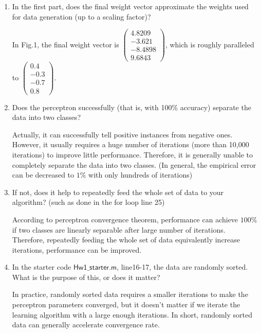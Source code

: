 \documentclass[12pt]{article}
\begin{document}
\begin{enumerate}
	\item In the first part, does the final weight vector approximate the weights used for data generation (up to a scaling factor)?
	\begin{flushleft}
		In Fig.1, the final weight vector is $\begin{pmatrix}4.8209 \\ -3.621\\-8.4898 \\ 9.6843\end{pmatrix}$, which is roughly 
		paralleled to $\begin{pmatrix}0.4 \\ -0.3 \\ -0.7 \\ 0.8\end{pmatrix}$.
	\end{flushleft}
	\item Does the perceptron successfully (that is, with 100\% accuracy) separate the data into two classes?
	\begin{flushleft}
		Actually, it can successfully tell positive instances from negative ones. However, it usually requires a huge number of iterations 
		(more than 10,000 iterations) to improve little performance. Therefore, it is generally unable to completely separate the data into two 
		classes. (In general, the empirical error can be decreased to $1\%$ with only 
		hundreds of iterations)
	\end{flushleft}
	\item If not, does it help to repeatedly feed the whole set of data to your algorithm? (such as done in the for loop line 25)
	\begin{flushleft}
		According to perceptron convergence theorem, performance can achieve $100\%$ if two classes are linearly separable after large number of 
		iterations. Therefore, repeatedly feeding the whole set of data equivalently increase iterations, performance can be improved.
	\end{flushleft}
	\item In the starter code $\mathsf{Hw1\_starter.m}$, line16-17, the data are randomly sorted. What is the purpose of this, or does it matter?
	\begin{flushleft}
		In practice, randomly sorted data requires a smaller iterations to make the perceptron parameters converged, but it doesn't matter if we 
		iterate the learning algorithm with a large enough iterations. In short, randomly sorted data can generally accelerate convergence rate.

\end{flushleft}
\end{enumerate}
\end{document}
